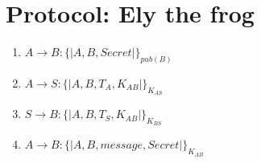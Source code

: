 \section{Protocol: Ely the frog}

\begin{enumerate}
    \item $ A \rightarrow B : \{|A, B, Secret|\}_{pub(B)}$
    \item $ A \rightarrow S : \{|A, B, T_{A}, K_{AB}|\}_{K_{AS}}$
    \item $ S \rightarrow B : \{|A, B, T_{S}, K_{AB}|\}_{K_{BS}}$
    \item $ A \rightarrow B : \{|A, B, message, Secret|\}_{K_{AB}}$
    \end{enumerate}